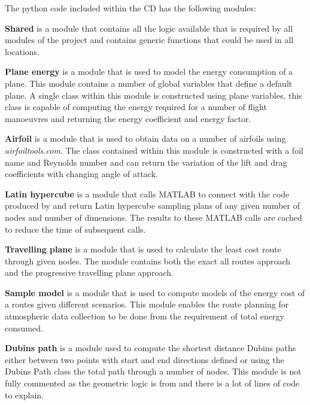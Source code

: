 \documentclass[a4paper,12pt,twoside]{article}
\begin{document}
The python code included within the CD has the following modules:

\textbf{Shared} is a module that contains all the logic available that is required by all modules of the project and contains generic functions that could be used in all locations.

\textbf{Plane energy} is a module that is used to model the energy consumption of a plane. This module contains a number of global variables that define a default plane. A single class within this module is constructed using plane variables, this class is capable of computing the energy required for a number of flight manoeuvres and returning the energy coefficient and energy factor.

\textbf{Airfoil} is a module that is used to obtain data on a number of airfoils using \textit{airfoiltools.com}. The class contained within this module is constructed with a foil name and Reynolds number and can return the variation of the lift and drag coefficients with changing angle of attack.

\textbf{Latin hypercube} is a module that calls MATLAB to connect with the code produced by  and return Latin hypercube sampling plans of any given number of nodes and number of dimensions. The results to these MATLAB calls are cached to reduce the time of subsequent calls.

\textbf{Travelling plane} is a module that is used to calculate the least cost route through given nodes. The module contains both the exact all routes approach and the progressive travelling plane approach.

\textbf{Sample model} is a module that is used to compute models of the energy cost of a routes given different scenarios. This module enables the route planning for atmospheric data collection to be done from the requirement of total energy consumed.

\textbf{Dubins path} is a module used to compute the shortest distance Dubins paths either between two points with start and end directions defined or using the Dubins Path class the total path through a number of nodes. This module is not fully commented as the geometric logic is from  and there is a lot of lines of code to explain.
\newpage


\newpage
\end{document}
